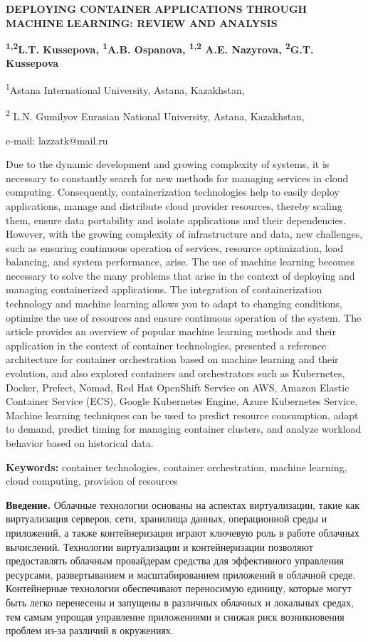 \textbf{DEPLOYING CONTAINER APPLICATIONS THROUGH MACHINE LEARNING:
REVIEW AND ANALYSIS}

\textbf{\textsuperscript{1,2}L.T. Kussepova, \textsuperscript{1}A.B.
Ospanova, \textsuperscript{1,2} A.E. Nazyrova, \textsuperscript{2}G.T.
Kussepova}

\textsuperscript{1}Astana International University, Astana, Kazakhstan,

\textsuperscript{2} L.N. Gumilyov Eurasian National University, Astana,
Kazakhstan,

e-mail: lazzatk@mail.ru

Due to the dynamic development and growing complexity of systems, it is
necessary to constantly search for new methods for managing services in
cloud computing. Consequently, containerization technologies help to
easily deploy applications, manage and distribute cloud provider
resources, thereby scaling them, ensure data portability and isolate
applications and their dependencies. However, with the growing
complexity of infrastructure and data, new challenges, such as ensuring
continuous operation of services, resource optimization, load balancing,
and system performance, arise. The use of machine learning becomes
necessary to solve the many problems that arise in the context of
deploying and managing containerized applications. The integration of
containerization technology and machine learning allows you to adapt to
changing conditions, optimize the use of resources and ensure continuous
operation of the system. The article provides an overview of popular
machine learning methods and their application in the context of
container technologies, presented a reference architecture for container
orchestration based on machine learning and their evolution, and also
explored containers and orchestrators such as Kubernetes, Docker,
Prefect, Nomad, Red Hat OpenShift Service on AWS, Amazon Elastic
Container Service (ECS), Google Kubernetes Engine, Azure Kubernetes
Service. Machine learning techniques can be used to predict resource
consumption, adapt to demand, predict timing for managing container
clusters, and analyze workload behavior based on historical data.

\textbf{Keywords:} container technologies, container orchestration,
machine learning, cloud computing, provision of resources

\textbf{Введение.} Облачные технологии основаны на аспектах
виртуализации, такие как виртуализация серверов, сети, хранилища данных,
операционной среды и приложений, а также контейнеризация играют ключевую
роль в работе облачных вычислений. Технологии виртуализации и
контейнеризации позволяют предоставлять облачным провайдерам средства
для эффективного управления ресурсами, развертыванием и масштабированием
приложений в облачной среде. Контейнерные технологии обеспечивают
переносимую единицу, которые могут быть легко перенесены и запущены в
различных облачных и локальных средах, тем самым упрощая управление
приложениями и снижая риск возникновения проблем из-за различий в
окружениях.

